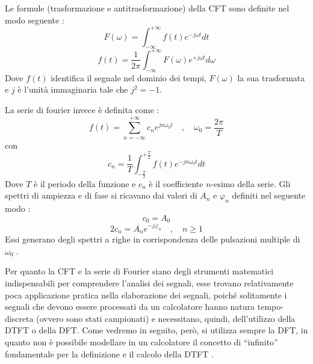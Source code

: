 Le formule (trasformazione e antitrasformazione) della CFT sono definite nel modo seguente \cite[p.~2.7]{calandrino}:
\begin{equation}
    {F}(\omega) = \int_{-\infty}^{+\infty} f(t){e}^{-j \omega t} dt
\end{equation}
\begin{equation}
    {f}(t) = \frac{1}{2\pi}\int_{-\infty}^{+\infty} F(\omega){e}^{+j \omega t} d\omega
\end{equation}
Dove $f(t)$ identifica il segnale nel dominio dei tempi, $F(\omega)$ la sua trasformata e $j$ è l'unità immaginaria tale che $j^2 = -1$.

La serie di fourier invece è definita come \cite[p.~2.4]{calandrino}:
\begin{equation}
    {f}(t) = \displaystyle\sum_{n=-\infty}^{+\infty} c_n e^{jn \omega_0 t} \quad, \quad \omega_0 = \frac{2\pi}{T}
\end{equation}
con
\begin{equation}
    c_n = \frac{1}{T}\int_{-\frac{T}{2}}^{+\frac{T}{2}}f(t)e^{-jn \omega_0 t} dt
\end{equation}
Dove $T$ è il periodo della funzione e $c_n$ è il coefficiente $n$-esimo della serie. Gli spettri di ampiezza e di fase si ricavano dai valori di $A_n$ e $\varphi_n$ definiti nel seguente modo \cite[p.~2.5]{calandrino}:
\begin{equation}
    c_0 = A_0
\end{equation}
\begin{equation}
    2 c_n = A_n e^{-j\varphi_n} \quad,\quad n \geq 1
\end{equation}
Essi generano degli spettri a righe in corrispondenza delle pulsazioni multiple di $\omega_0$ \cite[p.~2.5]{calandrino}.

Per quanto la CFT e la serie di Fourier siano degli strumenti matematici indispensabili per comprendere l'analisi dei segnali, esse trovano relativamente poca applicazione pratica nella elaborazione dei segnali, poiché solitamente i segnali che devono essere processati da un calcolatore hanno natura tempo-discreta (ovvero sono stati campionati) e necessitano, quindi, dell'utilizzo della DTFT o della DFT. Come vedremo in seguito, però, si utilizza sempre la DFT, in quanto non è possibile modellare in un calcolatore il concetto di ``infinito'' fondamentale per la definizione e il calcolo della DTFT \cite[pp.~144-145]{dspguide}.

